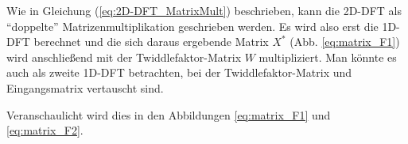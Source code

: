  



Wie in Gleichung (\ref{eq:2D-DFT_MatrixMult}) beschrieben, kann die 2D-DFT als ``doppelte'' Matrizenmultiplikation geschrieben werden.
Es wird also erst die 1D-DFT berechnet und die sich daraus ergebende Matrix $X^*$ (Abb. \ref{eq:matrix_F1}) wird anschließend mit der Twiddlefaktor-Matrix $W$ 
multipliziert. Man könnte es auch als zweite 1D-DFT betrachten, bei der Twiddlefaktor-Matrix und Eingangsmatrix vertauscht sind.

Veranschaulicht wird dies in den Abbildungen \ref{eq:matrix_F1} und \ref{eq:matrix_F2}.


